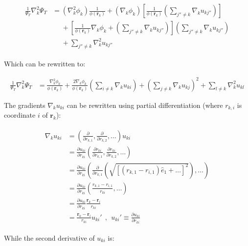 \documentclass[english, a4paper]{article}
\newcommand{\bm}[1]{\mathbf{#1}}
\begin{document}
\begin{align}
	\begin{split}
	\frac{1}{\Psi_T}\nabla_k^2\Psi_T &= (\nabla_k^2\phi_k)\frac{1}{\phi(\bm{r}_k)} + (\nabla_k\phi_k) \left[\frac{1}{\phi(\bm{r}_k)}\left(\sum_{j''\neq k}\nabla_ku_{kj''} \right)\right]\\
	&\:\:\:\:\:\: + \left[\frac{1}{\phi(\bm{r}_k)}\nabla_k\phi_k + \left(\sum_{j''\neq k}\nabla_ku_{kj''} \right)\right]\left(\sum_{j''\neq k}\nabla_ku_{kj''} \right)\\
	&\:\:\:\:\:\: + \sum_{j''\neq k}\nabla_k^2u_{kj''}
	\end{split}
\end{align}

Which can be rewritten to:

\begin{align}
	\frac{1}{\Psi_T}\nabla_k^2\Psi_T &= \frac{\nabla_k^2\phi_k}{\phi(\bm{r}_k)} + \frac{2\nabla_k\phi_k}{\phi(\bm{r}_k)}\left(\sum_{i\neq k}\nabla_ku_{ki} \right) + \left(\sum_{j\neq k}\nabla_ku_{kj} \right)^2 + \sum_{l\neq k}\nabla_k^2u_{kl}
\end{align}

The gradients $\nabla_k u_{ki}$ can be rewritten using partial differentiation (where $r_{k,i}$ is coordinate $i$ of $\bm{r}_k$):

\begin{align}
	\begin{split}
	\nabla_k u_{ki} &= \left(\frac{\partial}{\partial r_{k,1}}, \frac{\partial}{\partial r_{k,2}}, \ldots\right)u_{ki}\\
	&= \frac{\partial u_{ki}}{\partial r_{ki}}\left(\frac{\partial r_{ki}}{\partial r_{k,1}}, \frac{\partial r_{ki}}{\partial r_{k,2}}, \ldots\right)\\
	&= \frac{\partial u_{ki}}{\partial r_{ki}}\left( \frac{\partial}{\partial r_{k,1}}\left(\sqrt{\left[(r_{k,1}-r_{i,1})\hat{e}_1 + \ldots\right]^2}\right), \ldots \right)\\
	&= \frac{\partial u_{ki}}{\partial r_{ki}}\left(\frac{r_{k,1} - r_{i,1}}{r_{ki}}, \ldots \right)\\
	&= \frac{\partial u_{ki}}{\partial r_{ki}}\frac{\bm{r}_k - \bm{r}_i}{r_{ki}}\\
	&= \frac{\bm{r}_k - \bm{r}_i}{r_{ki}} u_{ki}' \:\:,\:\:  u_{ki}'\equiv \frac{\partial u_{ki}}{\partial r_{ki}}
	\end{split}
\end{align}

While the second derivative of $u_{ki}$ is:
\end{document}

